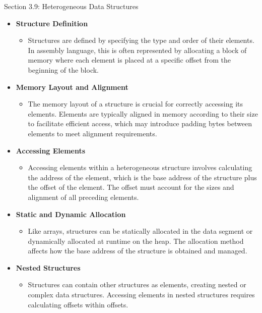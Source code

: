 \begin{notes}{Section 3.9: Heterogeneous Data Structures}
    \begin{itemize}
        \item \textbf{Structure Definition}
        \begin{itemize}
            \item Structures are defined by specifying the type and order of their elements. In assembly language, this is often represented by allocating a block of memory where each element is placed 
            at a specific offset from the beginning of the block.
        \end{itemize}
        \item \textbf{Memory Layout and Alignment}
        \begin{itemize}
            \item The memory layout of a structure is crucial for correctly accessing its elements. Elements are typically aligned in memory according to their size to facilitate efficient access, which 
            may introduce padding bytes between elements to meet alignment requirements.
        \end{itemize}
        \item \textbf{Accessing Elements}
        \begin{itemize}
            \item Accessing elements within a heterogeneous structure involves calculating the address of the element, which is the base address of the structure plus the offset of the element. The 
            offset must account for the sizes and alignment of all preceding elements.
        \end{itemize}
        \item \textbf{Static and Dynamic Allocation}
        \begin{itemize}
            \item Like arrays, structures can be statically allocated in the data segment or dynamically allocated at runtime on the heap. The allocation method affects how the base address of the 
            structure is obtained and managed.
        \end{itemize}
        \item \textbf{Nested Structures}
        \begin{itemize}
            \item Structures can contain other structures as elements, creating nested or complex data structures. Accessing elements in nested structures requires calculating offsets within offsets.
        \end{itemize}
    \end{itemize}
    

\end{notes}
